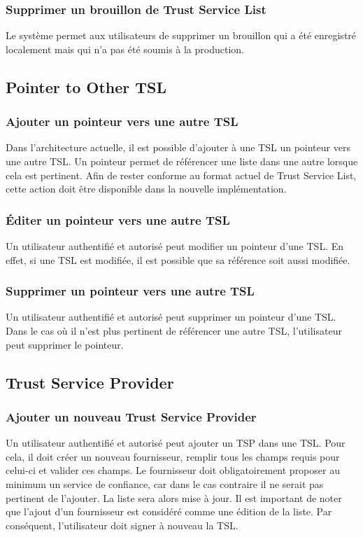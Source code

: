 \documentclass{tnreport}
\begin{document}
\subsubsection{Supprimer un brouillon de Trust Service List}
Le système permet aux utilisateurs de supprimer un brouillon qui a été enregistré localement mais qui n'a pas été soumis à la production.

\subsection{Pointer to Other TSL}
\subsubsection{Ajouter un pointeur vers une autre TSL}
Dans l'architecture actuelle, il est possible d'ajouter à une TSL un pointeur vers une autre TSL. Un pointeur permet de référencer une liste dans une autre lorsque cela est pertinent. Afin de rester conforme au format actuel de Trust Service List, cette action doit être disponible dans la nouvelle implémentation.
\subsubsection{Éditer un pointeur vers une autre TSL}
Un utilisateur authentifié et autorisé peut modifier un pointeur d'une TSL. En effet, si une TSL est modifiée, il est possible que sa référence soit aussi modifiée.
\subsubsection{Supprimer un pointeur vers une autre TSL}
Un utilisateur authentifié et autorisé peut supprimer un pointeur d'une TSL. Dans le cas où il n'est plus pertinent de référencer une autre TSL, l'utilisateur peut supprimer le pointeur.

\subsection{Trust Service Provider}
\subsubsection{Ajouter un nouveau Trust Service Provider}
Un utilisateur authentifié et autorisé peut ajouter un TSP dans une TSL. Pour cela, il doit créer un nouveau fournisseur, remplir tous les champs requis pour celui-ci et valider ces champs. Le fournisseur doit obligatoirement proposer au minimum un service de confiance, car dans le cas contraire il ne serait pas pertinent de l'ajouter. La liste sera alors mise à jour. Il est important de noter que l'ajout d'un fournisseur est considéré comme une édition de la liste. Par conséquent, l'utilisateur doit signer à nouveau la TSL.
\end{document}
